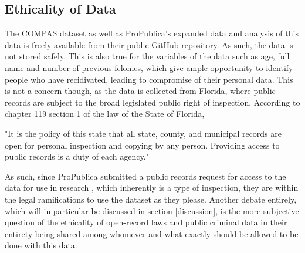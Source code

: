 \documentclass[11pt, fleqn, titlepage]{article}
\begin{document}
	
	
	\subsection{Ethicality of Data}
	The COMPAS dataset as well as ProPublica's expanded data and analysis of this data is freely available from their public GitHub repository. As such, the data is not stored safely. This is also true for the variables of the data such as age, full name and number of previous felonies, which give ample opportunity to identify people who have recidivated, leading to compromise of their personal data. This is not a concern though, as the data is collected from Florida, where public records are subject to the broad legislated public right of inspection. According to chapter 119 section 1 of the law of the State of Florida, 
	\begin{displayquote}
		"It is the policy of this state that all state, county, and municipal records are open for personal inspection and copying by any person. Providing access to public records is a duty of each agency." \cite{floridaLaw}
	\end{displayquote}
	
	\noindent As such, since ProPublica submitted a public records request for access to the data for use in research \cite{propublicaAnalysis}, which inherently is a type of inspection, they are within the legal ramifications to use the dataset as they please. Another debate entirely, which will in particular be discussed in section \ref{discussion}, is the more subjective question of the ethicality of open-record laws and public criminal data in their entirety being shared among whomever and what exactly should be allowed to be done with this data.
	
		
\end{document}
